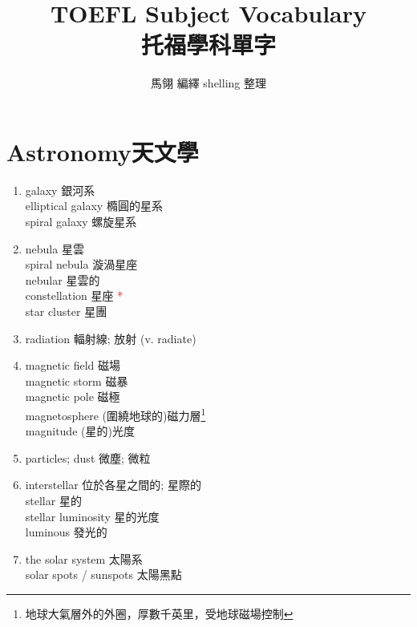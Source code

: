 \documentclass[twoside,b5paper]{book}
\begin{document}
  \title{TOEFL Subject Vocabulary\\ 托福學科單字}
  \author{馬翎 編繹 shelling 整理}
  \maketitle

  \tableofcontents %

  \chapter{Astronomy天文學}
  \begin{enumerate}
    \item
      galaxy  銀河系\\
      elliptical galaxy 橢圓的星系\\
      spiral galaxy 螺旋星系
    \item
      nebula  星雲\\
      spiral nebula 漩渦星座\\
      nebular 星雲的\\
      constellation  星座 \textcolor{red}{*}\\
      star cluster 星團
    \item
      radiation 輻射線; 放射 (v. radiate)
    \item
      magnetic field 磁場\\
      magnetic storm 磁暴\\
      magnetic pole 磁極\\
      magnetosphere (圍繞地球的)磁力層\footnote{地球大氣層外的外圈，厚數千英里，受地球磁場控制}\\
      magnitude (星的)光度
    \item
      particles; dust 微塵; 微粒
    \item
      interstellar  位於各星之間的; 星際的\\
      stellar  星的\\
      stellar luminosity  星的光度\\
      luminous  發光的
    \item
      the solar system 太陽系\\
      solar spots / sunspots 太陽黑點\\

\end{enumerate}
\end{document}
